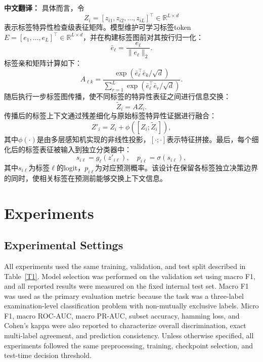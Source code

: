 \documentclass[Afour,sagev,times]{sagej}
\begin{document}
\textbf{中文翻译：} 具体而言，令
\begin{equation}
Z_i=[z_{i1},z_{i2},\ldots,z_{iL}]^{\top}\in\mathbb{R}^{L\times d}
\end{equation}
表示标签特异性检查级表征矩阵。模型维护可学习标签token $E=[e_1,\ldots,e_L]^{\top}\in\mathbb{R}^{L\times d}$，并在构建标签图前对其按行归一化：
\begin{equation}
\bar{e}_{\ell}=\frac{e_{\ell}}{\|e_{\ell}\|_2}.
\end{equation}
标签亲和矩阵计算如下：
\begin{equation}
A_{\ell k}=\frac{\exp(\bar{e}_{\ell}^{\top}\bar{e}_{k}/\sqrt{d})}{\sum_{r=1}^{L}\exp(\bar{e}_{\ell}^{\top}\bar{e}_{r}/\sqrt{d})}.
\end{equation}
随后执行一步标签图传播，使不同标签的特异性表征之间进行信息交换：
\begin{equation}
\tilde{Z}_{i}=AZ_i.
\end{equation}
传播后的标签上下文通过残差细化与原始标签特异性证据进行融合：
\begin{equation}
Z'_{i}=Z_i+\phi([Z_i;\tilde{Z}_{i}]),
\end{equation}
其中$\phi(\cdot)$是由多层感知机实现的非线性投影，$[\cdot;\cdot]$表示特征拼接。最后，每个细化后的标签表征被输入到独立分类器中：
\begin{equation}
s_{i\ell}=g_{\ell}(z'_{i\ell}), \quad p_{i\ell}=\sigma(s_{i\ell}),
\end{equation}
其中$s_{i\ell}$为标签$\ell$的logit，$p_{i\ell}$为对应预测概率。该设计在保留各标签独立决策边界的同时，使相关标签在预测前能够交换上下文信息。

\section{Experiments}

\subsection{Experimental Settings}
All experiments used the same training, validation, and test split described in Table~\ref{T1}. Model selection was performed on the validation set using macro F1, and all reported results were measured on the fixed internal test set. Macro F1 was used as the primary evaluation metric because the task was a three-label examination-level classification problem with non-mutually exclusive labels. Micro F1, macro ROC-AUC, macro PR-AUC, subset accuracy, hamming loss, and Cohen's kappa were also reported to characterize overall discrimination, exact multi-label agreement, and prediction consistency.\cite{R18} Unless otherwise specified, all experiments followed the same preprocessing, training, checkpoint selection, and test-time decision threshold.
\end{document}
